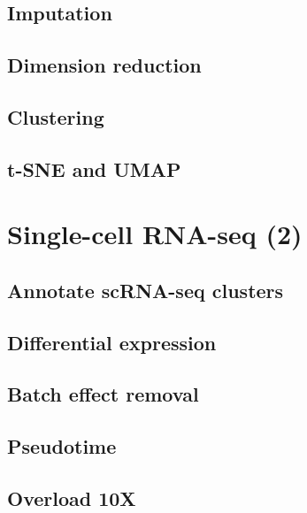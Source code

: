 \documentclass[]{book}
\begin{document}
\hypertarget{imputation}{%
\section{Imputation}\label{imputation}}

\hypertarget{dimension-reduction}{%
\section{Dimension reduction}\label{dimension-reduction}}

\hypertarget{clustering}{%
\section{Clustering}\label{clustering}}

\hypertarget{t-sne-and-umap}{%
\section{t-SNE and UMAP}\label{t-sne-and-umap}}

\hypertarget{scrna2}{%
\chapter{Single-cell RNA-seq (2)}\label{scrna2}}

\hypertarget{annotate-scrna-seq-clusters}{%
\section{Annotate scRNA-seq clusters}\label{annotate-scrna-seq-clusters}}

\hypertarget{differential-expression}{%
\section{Differential expression}\label{differential-expression}}

\hypertarget{batch-effect-removal-1}{%
\section{Batch effect removal}\label{batch-effect-removal-1}}

\hypertarget{pseudotime}{%
\section{Pseudotime}\label{pseudotime}}

\hypertarget{overload-10x}{%
\section{Overload 10X}\label{overload-10x}}
\end{document}
